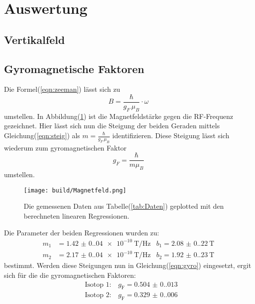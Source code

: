 \section{Auswertung}
	

	\subsection{Vertikalfeld}
		
		\noindent
				
		
	\subsection{Gyromagnetische Faktoren}
		
		\noindent
		Die Formel(\ref{eqn:zeeman}) lässt sich zu 
		\begin{equation*}
			B = \frac{\hbar}{g_F \, \mu_B} \cdot \omega
			\label{eqn:steig}
		\end{equation*}
		umstellen. In Abbildung(\ref{fig:Daten}) ist die Magnetfeldstärke gegen die RF-Frequenz gezeichnet.
		Hier lässt sich nun die Steigung der beiden Geraden mittels Gleichung(\ref{eqn:steig}) als $ m = \frac{\hbar}{g_F \, \mu_B}$ identifizieren.		
		Diese Steigung lässt sich wiederum zum gyromagnetischen Faktor
		\begin{equation}
		 	g_F = \frac{\hbar}{m \mu_B}
			\label{eqn:gyro}
		\end{equation}
		umstellen.		

		\begin{figure}[H]
			\centering
			\texttt{[image: build/Magnetfeld.png]}
			\caption{Die gemessenen Daten aus Tabelle(\ref{tab:Daten}) geplotted mit den berechneten linearen Regressionen.}
			\label{fig:Daten} 
		\end{figure}

		\noindent
		Die Parameter der beiden Regressionen wurden zu:
		\begin{align*}
			m_1 &= \SI{1.42(0.04)e-10}{\tesla\per\hertz}  &b_1= \SI{2.08(0.22)}{\tesla}\\
			m_2 &= \SI{2.17(0.04)e-10}{\tesla\per\hertz}  &b_2= \SI{1.92(0.23)}{\tesla}
		\end{align*}
		bestimmt. Werden diese Steigungen nun in Gleichung(\ref{eqn:gyro}) eingesetzt, ergit sich für die die gyromagnetischen Faktoren:
		\begin{align*}
			&\text{Isotop 1:} \quad g_\text{F} = \num{0.504(0.013)}\\		
			&\text{Isotop 2:} \quad g_\text{F} = \num{0.329(0.006)}			
		\end{align*}

